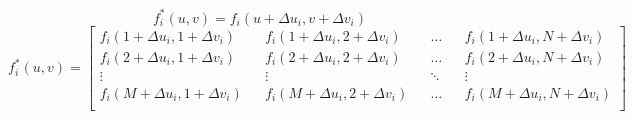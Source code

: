 \documentclass[../main.tex]{subfiles}%
\begin{document}
%
    \Xequation%
    \begin{equation*}%
        f_{i}^{*}(u,v)%
        =%
        f_{i}(u+\Delta u_{i},v+\Delta v_{i})%
    \end{equation*}%
    \begin{equation}%
        f_{i}^{*}(u,v) =%
        \begin{bmatrix}%
            f_{i}(1+\Delta u_{i},1+\Delta v_{i}) && f_{i}(1+\Delta u_{i},2+\Delta v_{i}) && \dots && f_{i}(1+\Delta u_{i},N+\Delta v_{i}) \\%
            f_{i}(2+\Delta u_{i},1+\Delta v_{i}) && f_{i}(2+\Delta u_{i},2+\Delta v_{i}) && \dots && f_{i}(2+\Delta u_{i},N+\Delta v_{i}) \\%
            \vdots && \vdots && \ddots && \vdots \\%
            f_{i}(M+\Delta u_{i},1+\Delta v_{i}) && f_{i}(M+\Delta u_{i},2+\Delta v_{i}) && \dots && f_{i}(M+\Delta u_{i},N+\Delta v_{i}) \\%
        \end{bmatrix}%
        \label{eq:super-sampling-shifted-function}%
    \end{equation}%
\end{document}
